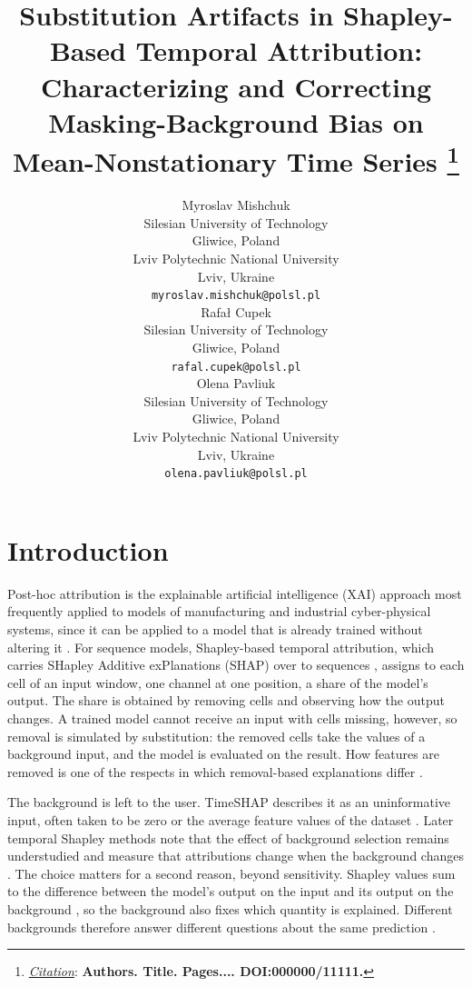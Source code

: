 \documentclass{article}
\title{Substitution Artifacts in Shapley-Based Temporal Attribution:
Characterizing and Correcting Masking-Background Bias on
Mean-Nonstationary Time Series
\thanks{\textit{\underline{Citation}}: 
\textbf{Authors. Title. Pages.... DOI:000000/11111.}} 
}
\author{
  Myroslav Mishchuk \\
  Silesian University of Technology \\ 
  Gliwice, Poland \\
  Lviv Polytechnic National University \\ 
  Lviv, Ukraine \\
  \texttt{myroslav.mishchuk@polsl.pl} \\
   \And
  Rafał Cupek \\
  Silesian University of Technology \\ 
  Gliwice, Poland\\
  \texttt{rafal.cupek@polsl.pl} \\
    \And
  Olena Pavliuk \\
  Silesian University of Technology \\ 
  Gliwice, Poland \\
  Lviv Polytechnic National University \\ 
  Lviv, Ukraine \\
  \texttt{olena.pavliuk@polsl.pl} \\
}
\newif\ifreview
\begin{document}
\maketitle

\ifreview\fi


\begin{abstract}
\lipsum[1]
\end{abstract}




\section{Introduction}
\label{sec:intro}

Post-hoc attribution is the explainable artificial intelligence (XAI) approach most frequently applied to models of manufacturing and industrial cyber-physical systems, since it can be applied to a model that is already trained without altering it \citep{moosavi2024explainable}. For sequence models, Shapley-based temporal attribution, which carries SHapley Additive exPlanations (SHAP) \citep{lundberg2017unified} over to sequences \citep{bento2021timeshap}, assigns to each cell of an input window, one channel at one position, a share of the model's output. The share is obtained by removing cells and observing how the output changes. A trained model cannot receive an input with cells missing, however, so removal is simulated by substitution: the removed cells take the values of a background input, and the model is evaluated on the result. How features are removed is one of the respects in which removal-based explanations differ \citep{covert2021explaining}.

The background is left to the user. TimeSHAP describes it as an uninformative input, often taken to be zero or the average feature values of the dataset \citep{bento2021timeshap}. Later temporal Shapley methods note that the effect of background selection remains understudied \citep{nguyen2025tshap} and measure that attributions change when the background changes \citep{kim2026groupsegment, papadeas2026empirical}. The choice matters for a second reason, beyond sensitivity. Shapley values sum to the difference between the model's output on the input and its output on the background \citep{lundberg2017unified, sundararajan2020many}, so the background also fixes which quantity is explained. Different backgrounds therefore answer different questions about the same prediction \citep{merrick2020explanation, mamalakis2023carefully}.
\end{document}
